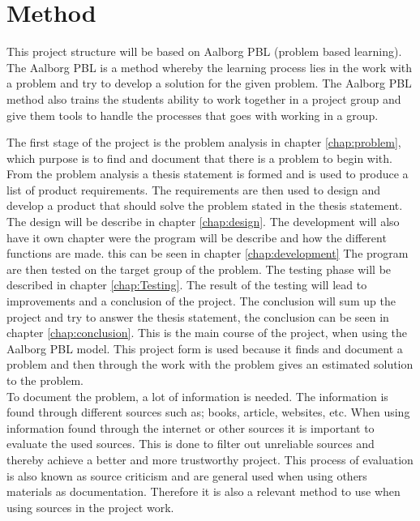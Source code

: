 \section{Method}
This project structure will be based on Aalborg PBL (problem based learning). The Aalborg PBL is a method whereby the learning process lies in the work with a problem and try to develop a solution for the given problem.
The Aalborg PBL method also trains the students ability to work together in a project group and give them tools to handle the processes that goes with working in a group.

The first stage of the project is the problem analysis in chapter \ref{chap:problem}, which purpose is to find and document that there is a problem to begin with. From the problem analysis a thesis statement is formed and is used to produce a list of product requirements.
The requirements are then used to design and develop a product that should solve the problem stated in the thesis statement. The design will be describe in chapter \ref{chap:design}.
The development will also have it own chapter were the program will be describe and how the different functions are made. this can be seen in chapter \ref{chap:development}
The program are then tested on the target group of the problem. The testing phase will be described in chapter \ref{chap:Testing}. The result of the testing will lead to improvements and a conclusion of the project. The conclusion will sum up the project and try to answer the thesis statement, the conclusion can be seen in chapter \ref{chap:conclusion}. This is the main course of the project, when using the Aalborg PBL model.
This project form is used because it finds and document a problem and then through the work with the problem gives an estimated solution to the problem.\\

To document the problem, a lot of information is needed. The information is found through different sources such as; books, article, websites, etc. When using information found through the internet or other sources it is important to evaluate the used sources.
This is done to filter out unreliable sources and thereby achieve a better and more trustworthy project.
This process of evaluation is also known as source criticism and are general used when using others materials as documentation. Therefore it is also a relevant method to use when using sources in the project work.\\